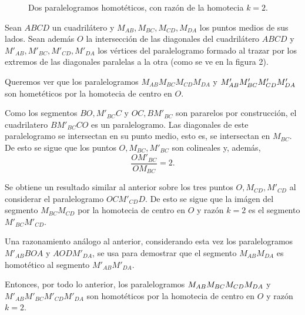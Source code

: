 {\begin{minipage}{8cm}
\begin{figure}[H]
				\vspace{-5em}\caption{Dos paralelogramos homotéticos, con razón de la homotecia $k=2$.}
			\end{figure}
		\end{minipage}
	}
\begin{sol}
	Sean $ABCD$ un cuadrilátero y $M_{AB},M_{BC},M_{CD},M_{DA}$ los puntos medios de sus lados. Sean además $O$ la intersección de las diagonales del cuadrilátero $ABCD$ y $M'_{AB},M'_{BC},M'_{CD},M'_{DA}$ los vértices del paralelogramo formado al trazar por los extremos de las diagonales paralelas a la otra (como se ve en la figura 2).
	
	Queremos ver que los paralelogramos $M_{AB}M_{BC}M_{CD}M_{DA} $ y $M'_{AB}\linebreak M'_{BC}M'_{CD}M'_{DA}$  son hometéticos por la homotecia de centro en $O$.
	
	Como los segmentos $BO,M'_{BC}C$ y $OC,BM'_{BC}$ son pararelos por construcción, el cuadrilatero $BM'_{BC}CO$ es un paralelogramo. Las diagonales de este paralelogramo se intersectan en su punto medio, esto es, se intersectan en $M_{BC}$. De esto se sigue que los puntos $O,M_{BC},M'_{BC}$ son colineales y, además, 
	\[ \frac{OM'_{BC}}{OM_{BC}} = 2. \]
	
	Se obtiene un resultado similar al anterior sobre los tres puntos $O,M_{CD},M'_{CD}$ al considerar el paralelogramo $OCM'_{CD}D$. De esto se sigue que la imágen del segmento $M_{BC}M_{CD}$ por la homotecia de centro en $O$ y razón $k=2$ es el segmento $M'_{BC}M'_{CD}$.
	
	Una razonamiento análogo al anterior, considerando esta vez los paralelogramos $M'_{AB}BOA$ y $AODM'_{DA}$, se usa para demostrar que el segmento $M_{AB}M_{DA}$ es homotético al segmento $M'_{AB}M'_{DA}$.
	
	Entonces, por todo lo anterior, los paralelogramos $M_{AB}M_{BC}M_{CD}\linebreak M_{DA} $ y $M'_{AB}M'_{BC}M'_{CD}M'_{DA}$  son homotéticos por la homotecia de centro en $O$ y razón $k=2$.
\end{sol}
